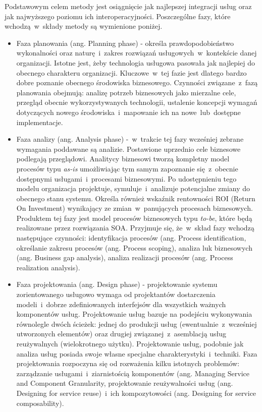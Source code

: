 Podstawowym celem metody jest osiągnięcie jak najlepszej integracji usług oraz jak najwyższego poziomu ich interoperacyjności. Poszczególne fazy, które wchodzą~w~składy metody są wymienione poniżej.
\begin{itemize}
\item{Faza planowania (ang. Planning phase) - określa prawdopodobieństwo wykonalności oraz  naturę~i~zakres rozwiązań usługowych~w~kontekście danej organizacji.  Istotne jest, żeby technologia usługowa pasowała jak najlepiej do obecnego charakteru organizacji. Kluczowe~w~tej fazie jest dlatego bardzo dobre poznanie obecnego środowiska biznesowego. Czynności związane~z~fazą planowania obejmują: analizę potrzeb biznesowych jako mierzalne cele,  przegląd obecnie wykorzystywanych technologii, ustalenie koncepcji wymagań dotyczących nowego środowiska~i~mapowanie ich na nowe~lub~dostępne implementacje.}

\item{Faza analizy (ang. Analysis phase) -~w~trakcie tej fazy wcześniej zebrane wymagania poddawane są analizie. Postawione uprzednio cele biznesowe podlegają przeglądowi. Analitycy biznesowi tworzą kompletny model procesów typu \emph{as-is} umożliwiając tym samym zapoznanie się~z~obecnie dostępnymi usługami~i~procesami biznesowymi. Po udostępnieniu tego modelu organizacja projektuje, symuluje~i~analizuje potencjalne zmiany do obecnego stanu systemu. Określa również wskaźnik rentowności ROI (Return On Investment) wynikający ze zmian~w~panujących procesach biznesowych. Produktem tej fazy jest model procesów biznesowych typu \emph{to-be}, które będą realizowane przez rozwiązania SOA. Przyjmuje się, że~w~skład fazy wchodzą następujące czynności: identyfikacja procesów (ang. Process identification, określanie zakresu procesów (ang. Process scoping), analiza luk biznesowych (ang. Business gap analysis), analiza realizacji procesów (ang. Process realization analysis).}

\item{Faza projektowania (ang. Design phase) - projektowanie systemu zorientowanego usługowo wymaga od projektantów dostarczenia modeli~i~dobrze zdefiniowanych interfejsów dla wszystkich ważnych komponentów usług. Projektowanie usług bazuje na podejściu wykonywania równolegle dwóch ścieżek: jednej do produkcji usług (ewentualnie~z~wcześniej utworzonych elementów) oraz drugiej związanej~z~asemblacją usług reużywalnych (wielokrotnego użytku). Projektowanie usług, podobnie jak analiza usług posiada swoje własne specjalne charakterystyki~i~techniki. Faza projektowania rozpoczyna się od rozważenia kilku istotnych problemów: zarządzanie usługami~i~ziarnistością komponentów (ang. Managing Service and Component Granularity, projektowanie reużywalności usług (ang. Designing for service reuse)~i~ich kompozytowości (ang. Designing for service composability).}


\end{itemize}
